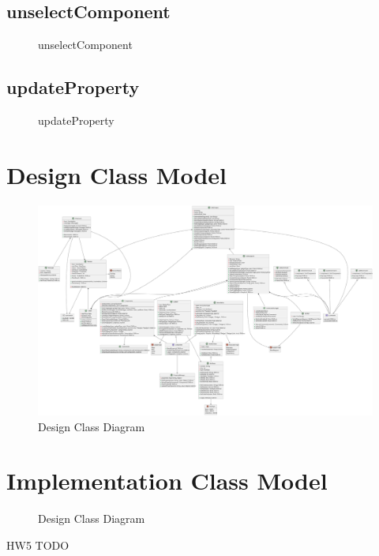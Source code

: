 \documentclass[12pt]{article}
\begin{document}

    \subsection{unselectComponent}
    \begin{figure}[H]
        \centering
        
        \caption{unselectComponent}
    \end{figure}


    \subsection{updateProperty}
    \begin{figure}[H]
        \centering
        
        \caption{updateProperty}
    \end{figure}


    \section{Design Class Model}

    \begin{figure}[H]
        \centering
        \includegraphics[inkscapelatex=false,height=0.9\textheight]{assets/hw4/dcd.svg}
        \caption{Design Class Diagram}
    \end{figure}




    \section{Implementation Class Model}
    \begin{figure}[H]
        \centering
        
        \caption{Design Class Diagram}
    \end{figure}
    HW5 TODO
    \newpage
\end{document}
